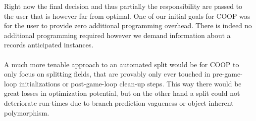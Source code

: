 Right now the final decision and thus partially the responsibility are passed to the user that is however far from optimal. One of our initial goals for COOP was for the user to provide zero additional programming overhead. There is indeed no additional programming required however we demand information about a records anticipated instances.\\\\
A much more tenable approach to an automated split would be for COOP to only focus on splitting fields, that are provably only ever touched in pre-game-loop initializations or post-game-loop clean-up steps. This way there would be great losses in optimization potential, but on the other hand a split could not deteriorate run-times due to branch prediction vagueness or object inherent polymorphism.

